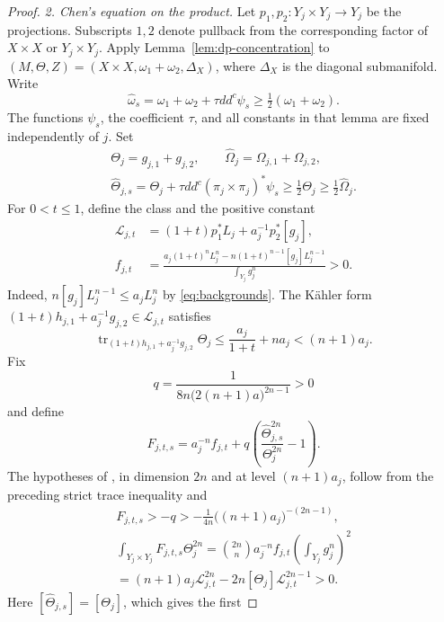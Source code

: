 \documentclass[reqno]{amsart}
\numberwithin{equation}{section}
\theoremstyle{definition}
\DeclareMathOperator{\tr}{tr}
\begin{document}
\begin{proof}
\smallskip\noindent
\emph{2. Chen's equation on the product.}
Let $p_1,p_2:Y_j\times Y_j\to Y_j$ be the projections.
Subscripts $1,2$ denote pullback from the corresponding factor of
$X\times X$ or $Y_j\times Y_j$.
Apply Lemma~\ref{lem:dp-concentration} to
$(M,\Theta,Z)=(X\times X,\omega_1+\omega_2,\Delta_X)$, where $\Delta_X$ is the diagonal submanifold.
Write
\[
 \widehat\omega_s=\omega_1+\omega_2+\tau dd^c\psi_s
       \ge\tfrac12(\omega_1+\omega_2).
\]
The functions $\psi_s$, the coefficient $\tau$, and all constants
in that lemma are fixed independently of $j$. Set
\begin{equation}\label{eq:product-backgrounds}
 \begin{gathered}
 \Theta_j=g_{j,1}+g_{j,2},\qquad
 \widehat\Omega_j=\Omega_{j,1}+\Omega_{j,2},\\
 \widehat\Theta_{j,s}
 =\Theta_j+\tau dd^c(\pi_j\times\pi_j)^*\psi_s
 \ge\tfrac12\Theta_j\ge\tfrac12\widehat\Omega_j.
 \end{gathered}
\end{equation}
For $0<t\le1$, define the class and the positive constant
\[
 \begin{aligned}
 \mathcal L_{j,t}
   &=(1+t)p_1^*L_j+a_j^{-1}p_2^*[g_j],\\
 f_{j,t}
   &=\frac{a_j(1+t)^nL_j^n
           -n(1+t)^{n-1}[g_j]L_j^{n-1}}{\int_{Y_j}g_j^n}>0.
 \end{aligned}
\]
Indeed, $n[g_j]L_j^{n-1}\le a_jL_j^n$ by
\eqref{eq:backgrounds}. The K\"ahler form
$(1+t)h_{j,1}+a_j^{-1}g_{j,2}\in\mathcal L_{j,t}$ satisfies
\[
 \tr_{(1+t)h_{j,1}+a_j^{-1}g_{j,2}}\Theta_j
 \le\frac{a_j}{1+t}+na_j<(n+1)a_j.
\]
Fix
\[
 q=\frac1{8n\bigl(2(n+1)a\bigr)^{2n-1}}>0
\]
and define
\[
 F_{j,t,s}
 =a_j^{-n}f_{j,t}
       +q\left(\frac{\widehat\Theta_{j,s}^{2n}}{\Theta_j^{2n}}-1\right).
\]
The hypotheses of \cite[Theorem~1.14]{C21}, in dimension $2n$
and at level $(n+1)a_j$, follow from the preceding strict trace
inequality and
\begin{equation}\label{eq:chen-hypotheses}
 \begin{gathered}
 F_{j,t,s}>-q>-\frac1{4n}\bigl((n+1)a_j\bigr)^{-(2n-1)},\\
 \int_{Y_j\times Y_j}F_{j,t,s}\Theta_j^{2n}
 =\binom{2n}{n}a_j^{-n}f_{j,t}
                           \left(\int_{Y_j}g_j^n\right)^2\\
 =(n+1)a_j\mathcal L_{j,t}^{2n}
       -2n[\Theta_j]\mathcal L_{j,t}^{2n-1}>0.
 \end{gathered}
\end{equation}
Here $[\widehat\Theta_{j,s}]=[\Theta_j]$, which gives the first

\end{proof}
\end{document}
